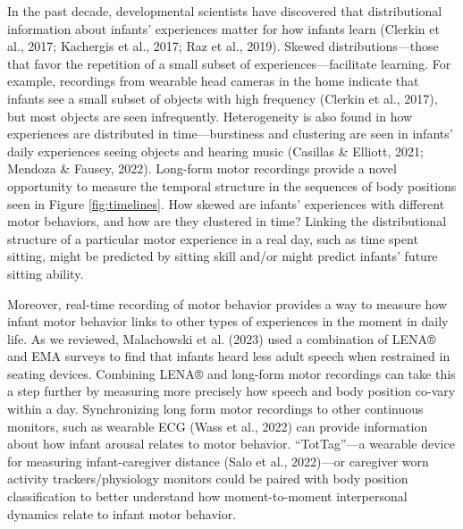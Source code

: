 \documentclass[
  man]{apa6}
\begin{document}
In the past decade, developmental scientists have discovered that distributional information about infants' experiences matter for how infants learn (Clerkin et al., 2017; Kachergis et al., 2017; Raz et al., 2019). Skewed distributions---those that favor the repetition of a small subset of experiences---facilitate learning. For example, recordings from wearable head cameras in the home indicate that infants see a small subset of objects with high frequency (Clerkin et al., 2017), but most objects are seen infrequently. Heterogeneity is also found in how experiences are distributed in time---burstiness and clustering are seen in infants' daily experiences seeing objects and hearing music (Casillas \& Elliott, 2021; Mendoza \& Fausey, 2022). Long-form motor recordings provide a novel opportunity to measure the temporal structure in the sequences of body positions seen in Figure \ref{fig:timelines}. How skewed are infants' experiences with different motor behaviors, and how are they clustered in time? Linking the distributional structure of a particular motor experience in a real day, such as time spent sitting, might be predicted by sitting skill and/or might predict infants' future sitting ability.

Moreover, real-time recording of motor behavior provides a way to measure how infant motor behavior links to other types of experiences in the moment in daily life. As we reviewed, Malachowski et al. (2023) used a combination of LENA® and EMA surveys to find that infants heard less adult speech when restrained in seating devices. Combining LENA® and long-form motor recordings can take this a step further by measuring more precisely how speech and body position co-vary within a day. Synchronizing long form motor recordings to other continuous monitors, such as wearable ECG (Wass et al., 2022) can provide information about how infant arousal relates to motor behavior. ``TotTag''---a wearable device for measuring infant-caregiver distance (Salo et al., 2022)---or caregiver worn activity trackers/physiology monitors could be paired with body position classification to better understand how moment-to-moment interpersonal dynamics relate to infant motor behavior.
\end{document}
